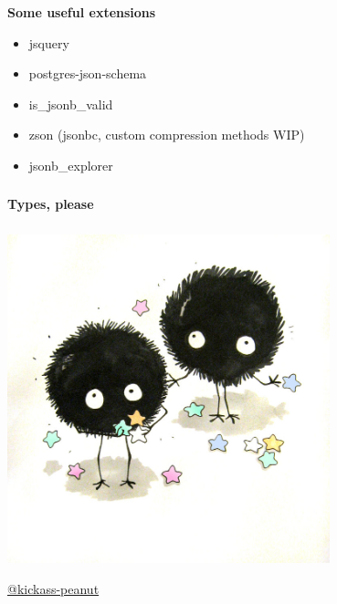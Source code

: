 \documentclass[usenames,dvipsnames, 18pt, compress, aspectratio=169]{beamer}
\begin{document}
\begin{frame}
    \frametitle{}
    \begin{center}
        \textbf{Some useful extensions}

        \begin{itemize}[label={\MVRightarrow}]
            \item jsquery
            \item postgres-json-schema
            \item is\_jsonb\_valid
            \item zson (jsonbc, custom compression methods WIP)
            \item jsonb\_explorer
        \end{itemize}

    \end{center}
\end{frame}

\begin{frame}
    \frametitle{}
    \begin{center}
    \textbf{Types, please}

    \end{center}
\end{frame}

\begin{frame}
    \frametitle{}
    \begin{center}

        \includegraphics[width=0.7\textwidth,center]{fuzzy.jpg}

        \vspace{-2cm}
        \tiny{\href{https://kickass-peanut.deviantart.com/}{@kickass-peanut}}

    \end{center}
\end{frame}
\end{document}

